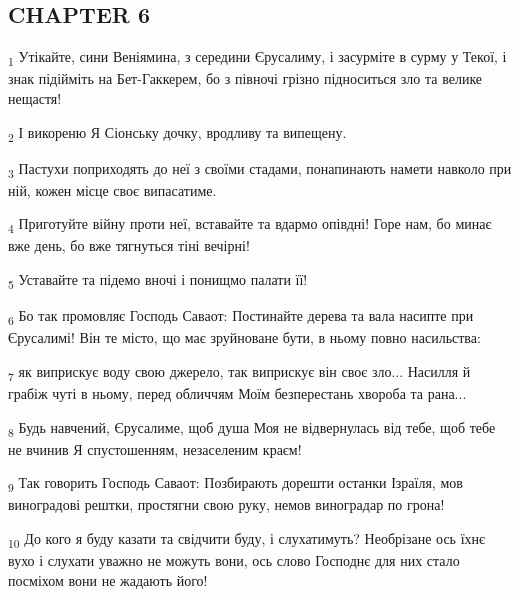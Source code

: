 \subsection{CHAPTER 6}
\begin{tcolorbox}
\textsubscript{1} Утікайте, сини Веніямина, з середини Єрусалиму, і засурміте в сурму у Текої, і знак підійміть на Бет-Гаккерем, бо з півночі грізно підноситься зло та велике нещастя!
\end{tcolorbox}
\begin{tcolorbox}
\textsubscript{2} І викореню Я Сіонську дочку, вродливу та випещену.
\end{tcolorbox}
\begin{tcolorbox}
\textsubscript{3} Пастухи поприходять до неї з своїми стадами, понапинають намети навколо при ній, кожен місце своє випасатиме.
\end{tcolorbox}
\begin{tcolorbox}
\textsubscript{4} Приготуйте війну проти неї, вставайте та вдармо опівдні! Горе нам, бо минає вже день, бо вже тягнуться тіні вечірні!
\end{tcolorbox}
\begin{tcolorbox}
\textsubscript{5} Уставайте та підемо вночі і понищмо палати її!
\end{tcolorbox}
\begin{tcolorbox}
\textsubscript{6} Бо так промовляє Господь Саваот: Постинайте дерева та вала насипте при Єрусалимі! Він те місто, що має зруйноване бути, в ньому повно насильства:
\end{tcolorbox}
\begin{tcolorbox}
\textsubscript{7} як виприскує воду свою джерело, так виприскує він своє зло... Насилля й грабіж чуті в ньому, перед обличчям Моїм безперестань хвороба та рана...
\end{tcolorbox}
\begin{tcolorbox}
\textsubscript{8} Будь навчений, Єрусалиме, щоб душа Моя не відвернулась від тебе, щоб тебе не вчинив Я спустошенням, незаселеним краєм!
\end{tcolorbox}
\begin{tcolorbox}
\textsubscript{9} Так говорить Господь Саваот: Позбирають дорешти останки Ізраїля, мов виноградові рештки, простягни свою руку, немов виноградар по грона!
\end{tcolorbox}
\begin{tcolorbox}
\textsubscript{10} До кого я буду казати та свідчити буду, і слухатимуть? Необрізане ось їхнє вухо і слухати уважно не можуть вони, ось слово Господнє для них стало посміхом вони не жадають його!
\end{tcolorbox}
